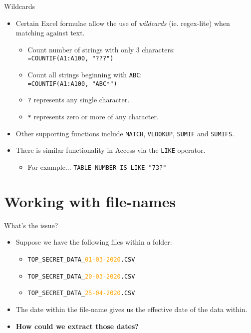 \documentclass[
	usenames,
	dvipsnames,
	handout
] {beamer}
\begin{document}
\begin{frame}{Wildcards}
	\begin{itemize}[label=\textbullet]
		\item Certain Excel formulae allow the use of \textit{wildcards} (ie. regex-lite) when matching against text.
		      \pause

		      \begin{itemize}[label=\textendash]
			      	\item Count number of strings with only 3 characters:\\
			      	      \hfill\texttt{=COUNTIF(A1:A100, "???")}
			      	      \medskip
			      	      \pause
			      	\item Count all strings beginning with \texttt{ABC}:\\
			      	      \hfill\texttt{=COUNTIF(A1:A100, "ABC*")}
			      	      \medskip
			      	      \pause
			      	\item \texttt{?} represents any single character.
			      	      \pause
			      	\item \texttt{*} represents zero or more of any character.
			      		\pause
		      \end{itemize}
		      \medskip
		      
		\item Other supporting functions include \texttt{MATCH}, \texttt{VLOOKUP}, \texttt{SUMIF} and \texttt{SUMIFS}.
			\pause
		      \medskip		      
		\item There is similar functionality in Access via the \texttt{LIKE} operator.
		      \pause
		      \begin{itemize}
		      		\item For example... \hfill\texttt{TABLE\_NUMBER IS LIKE "73?"}
		      \end{itemize}
	\end{itemize}
\end{frame}
  
\section{Working with file-names}
\begin{frame}{What's the issue?}
	\begin{itemize}[label=\textbullet]
		\item<1-> Suppose we have the following files within a folder: \\
			\medskip
			\begin{itemize}
				\item<2-> \texttt{TOP\_SECRET\_DATA\_\textcolor<3->{orange}{01-03-2020}.CSV}
				\item<2-> \texttt{TOP\_SECRET\_DATA\_\textcolor<3->{orange}{20-03-2020}.CSV}
				\item<2-> \texttt{TOP\_SECRET\_DATA\_\textcolor<3->{orange}{25-04-2020}.CSV}
			\end{itemize}
		\item<3-> The date within the file-name gives us the effective date of the data within.
		\item<4-> \textbf{How could we extract those dates?}
	\end{itemize}
\end{frame}
    
\end{document}
